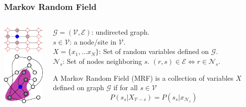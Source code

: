 \documentclass[sansserif, 10pt]{beamer}
\begin{document}
\begin{frame}
\frametitle{Markov Random Field}
\begin{columns}
  \begin{column}{3cm}
    \includegraphics[width=3cm]{sfig/mrf}\\
    \vspace{5pt}
    \includegraphics[width=3cm]{sfig/general_mrf}
  \end{column}

  \begin{column}{7cm}

    \begin{definition}
      $\mathcal{G} = (\mathcal{V}, \mathcal{E})$: undirected graph.\\
      $s \in \mathcal{V}$: a node/site in $\mathcal{V}$. \\
      $X = \{x_1, \dots x_N\}$: Set of random variables defined on $\mathcal{G}$.\\
      $\mathcal{N}_s$: Set of nodes neighboring $s$. $(r,s) \in \mathcal{E} \Leftrightarrow  r\in \mathcal{N}_s $.
    \end{definition}

    \begin{definition}
      A \alert{Markov Random Field} (MRF) is a collection of variables $X$ defined on
      graph $\mathcal{G}$ if for all $s \in
      \mathcal{V}$
      \begin{equation*}
        P(s_s | X_{\mathcal{V}-s}) = P(s_s | x_{\mathcal{N}_s})
      \end{equation*}
    \end{definition}
  \end{column}
\end{columns}
\end{frame}
\end{document}
